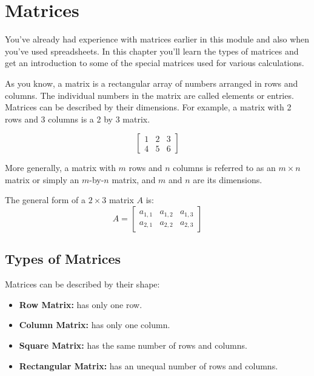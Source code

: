 \chapter{Matrices}
You've already had experience with matrices earlier in this module and also when you've used spreadsheets. In this chapter you'll learn the types of matrices and get an introduction to some of the special matrices used for various calculations. 

As you know, a matrix is a rectangular array of numbers arranged in rows and columns. The individual numbers in the matrix are called elements or entries. Matrices can be described by their dimensions. For example, a matrix with 2 rows and 3 columns is a 2 by 3 matrix.

$$\begin{bmatrix}
1 & 2 & 3\\
4 & 5 & 6 
\end{bmatrix}
$$

More generally, a matrix with $m$ rows and $n$ columns is referred to as an $m \times n$ matrix or simply an $m$-by-$n$ matrix, and $m$ and $n$ are its dimensions.

The general form of a $2 \times 3$ matrix $A$ is:
$$
A = \begin{bmatrix}
a_{1,1} & a_{1,2} & a_{1,3} \\
a_{2,1} & a_{2,2} & a_{2,3}
\end{bmatrix}
$$

\section{Types of Matrices}
Matrices can be described by their shape:
\begin{itemize}
	\item \textbf{Row Matrix:} has only one row.
	\item \textbf{Column Matrix:} has only one column.
	\item \textbf{Square Matrix:} has the same number of rows and columns.
	\item \textbf{Rectangular Matrix:} has an unequal number of rows and columns.
\end{itemize}

